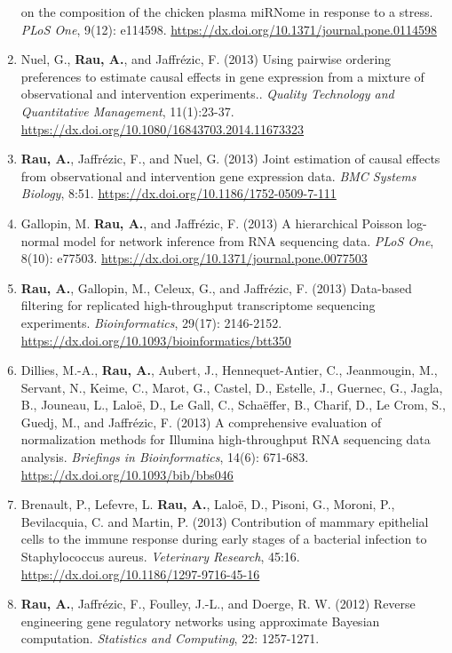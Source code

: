 \documentclass[11pt, a4paper]{awesome-cv}
\begin{document}
\begin{enumerate}
  on the composition of the chicken plasma miRNome in response to a
  stress. \emph{PLoS One}, 9(12): e114598.
  \url{https://dx.doi.org/10.1371/journal.pone.0114598}
\item
  Nuel, G., \textbf{Rau, A.}, and Jaffrézic, F. (2013) Using pairwise
  ordering preferences to estimate causal effects in gene expression
  from a mixture of observational and intervention experiments..
  \emph{Quality Technology and Quantitative Management}, 11(1):23-37.
  \url{https://dx.doi.org/10.1080/16843703.2014.11673323}
\item
  \textbf{Rau, A.}, Jaffrézic, F., and Nuel, G. (2013) Joint estimation
  of causal effects from observational and intervention gene expression
  data. \emph{BMC Systems Biology}, 8:51.
  \url{https://dx.doi.org/10.1186/1752-0509-7-111}
\item
  Gallopin, M. \textbf{Rau, A.}, and Jaffrézic, F. (2013) A hierarchical
  Poisson log-normal model for network inference from RNA sequencing
  data. \emph{PLoS One}, 8(10): e77503.
  \url{https://dx.doi.org/10.1371/journal.pone.0077503}
\item
  \textbf{Rau, A.}, Gallopin, M., Celeux, G., and Jaffrézic, F. (2013)
  Data-based filtering for replicated high-throughput transcriptome
  sequencing experiments. \emph{Bioinformatics}, 29(17): 2146-2152.
  \url{https://dx.doi.org/10.1093/bioinformatics/btt350}
\item
  Dillies, M.-A., \textbf{Rau, A.}, Aubert, J., Hennequet-Antier, C.,
  Jeanmougin, M., Servant, N., Keime, C., Marot, G., Castel, D.,
  Estelle, J., Guernec, G., Jagla, B., Jouneau, L., Laloë, D., Le Gall,
  C., Schaëffer, B., Charif, D., Le Crom, S., Guedj, M., and Jaffrézic,
  F. (2013) A comprehensive evaluation of normalization methods for
  Illumina high-throughput RNA sequencing data analysis. \emph{Briefings
  in Bioinformatics}, 14(6): 671-683.
  \url{https://dx.doi.org/10.1093/bib/bbs046}
\item
  Brenault, P., Lefevre, L. \textbf{Rau, A.}, Laloë, D., Pisoni, G.,
  Moroni, P., Bevilacquia, C. and Martin, P. (2013) Contribution of
  mammary epithelial cells to the immune response during early stages of
  a bacterial infection to Staphylococcus aureus. \emph{Veterinary
  Research}, 45:16. \url{https://dx.doi.org/10.1186/1297-9716-45-16}
\item
  \textbf{Rau, A.}, Jaffrézic, F., Foulley, J.-L., and Doerge, R. W.
  (2012) Reverse engineering gene regulatory networks using approximate
  Bayesian computation. \emph{Statistics and Computing}, 22: 1257-1271.

\end{enumerate}
\end{document}
